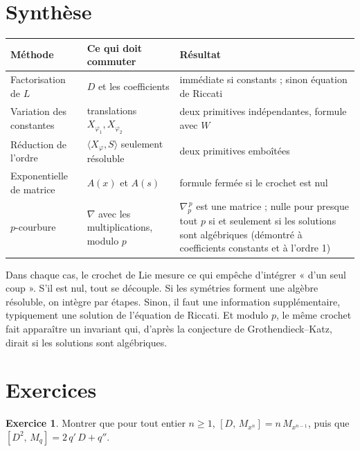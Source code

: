 \documentclass[11pt,a4paper]{article}
\theoremstyle{plain}
\theoremstyle{definition}
\newtheorem{exercice}{Exercice}
\theoremstyle{remark}
\newcommand{\Dx}{D}
\newcommand{\M}[1]{M_{#1}}
\newcommand{\cro}[2]{\left[#1,\,#2\right]}
\begin{document}
\section{Synthèse}

\begin{center}
\renewcommand{\arraystretch}{1.25}
\begin{tabular}{@{}p{3.6cm}p{4.4cm}p{5.4cm}@{}}
\toprule
\textbf{Méthode} & \textbf{Ce qui doit commuter} & \textbf{Résultat} \\
\midrule
Factorisation de $L$ & $\Dx$ et les coefficients & immédiate si constants ; sinon équation de Riccati \\
Variation des constantes & translations $X_{\varphi_1}, X_{\varphi_2}$ & deux primitives indépendantes, formule avec $W$ \\
Réduction de l'ordre & $\langle X_\varphi, S\rangle$ seulement résoluble & deux primitives emboîtées \\
Exponentielle de matrice & $A(x)$ et $A(s)$ & formule fermée si le crochet est nul \\
$p$-courbure & $\nabla$ avec les multiplications, modulo $p$ & $\nabla_p^{\,p}$ est une matrice ; nulle pour presque tout $p$ si et seulement si les solutions sont algébriques (démontré à coefficients constants et à l'ordre 1) \\
\bottomrule
\end{tabular}
\end{center}

Dans chaque cas, le crochet de Lie mesure ce qui empêche d'intégrer « d'un seul coup ». S'il est nul, tout se découple. Si les symétries forment une algèbre résoluble, on intègre par étapes. Sinon, il faut une information supplémentaire, typiquement une solution de l'équation de Riccati. Et modulo $p$, le même crochet fait apparaître un invariant qui, d'après la conjecture de Grothendieck--Katz, dirait si les solutions sont algébriques.

\section{Exercices}

\begin{exercice}
Montrer que pour tout entier $n \geq 1$, $\cro{\Dx}{\M{x^n}} = n\,\M{x^{n-1}}$, puis que $\cro{\Dx^2}{\M{q}} = 2\,q'\,\Dx + q''$.
\end{exercice}
\end{document}
